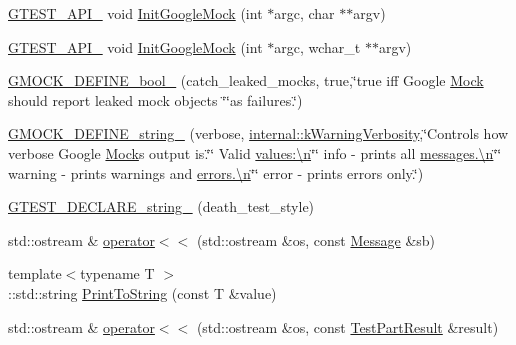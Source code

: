\begin{DoxyCompactItemize}
\hyperlink{gtest-port_8h_aa73be6f0ba4a7456180a94904ce17790}{G\+T\+E\+S\+T\+\_\+\+A\+P\+I\+\_\+} void \hyperlink{namespacetesting_a32b1c6db9ba5133ccabfa67616b3c041}{Init\+Google\+Mock} (int $\ast$argc, char $\ast$$\ast$argv)
\item 
\hyperlink{gtest-port_8h_aa73be6f0ba4a7456180a94904ce17790}{G\+T\+E\+S\+T\+\_\+\+A\+P\+I\+\_\+} void \hyperlink{namespacetesting_a20fb86152763dddef67bc1dd8b090800}{Init\+Google\+Mock} (int $\ast$argc, wchar\+\_\+t $\ast$$\ast$argv)
\item 
\hyperlink{namespacetesting_ac4efd3cec9fd78f180d825c1d178b970}{G\+M\+O\+C\+K\+\_\+\+D\+E\+F\+I\+N\+E\+\_\+bool\+\_\+} (catch\+\_\+leaked\+\_\+mocks, true,\char`\"{}true iff Google \hyperlink{classtesting_1_1Mock}{Mock} should report leaked mock objects \char`\"{}\char`\"{}as failures.\char`\"{})
\item 
\hyperlink{namespacetesting_a17cbc94a0a3ef8fdf7d58fc5dcdcce2a}{G\+M\+O\+C\+K\+\_\+\+D\+E\+F\+I\+N\+E\+\_\+string\+\_\+} (verbose, \hyperlink{namespacetesting_1_1internal_ad9386ccda6b6deac2f7b84784d3088c0}{internal\+::k\+Warning\+Verbosity},\char`\"{}Controls how verbose Google \hyperlink{classtesting_1_1Mock}{Mock}\textquotesingle{}s output is.\char`\"{}\char`\"{}  Valid \hyperlink{app_2main_8cpp_acfc02ec89670db29251fda6a66602ce2}{values\+:\textbackslash{}n}\char`\"{}\char`\"{}  info    -\/ prints all \hyperlink{app_2main_8cpp_acfc02ec89670db29251fda6a66602ce2}{messages.\textbackslash{}n}\char`\"{}\char`\"{}  warning -\/ prints warnings and \hyperlink{app_2main_8cpp_acfc02ec89670db29251fda6a66602ce2}{errors.\textbackslash{}n}\char`\"{}\char`\"{}  error   -\/ prints errors only.\char`\"{})
\item 
\hyperlink{namespacetesting_a37b7e87f0a5f502c6918f37d1768c1f3}{G\+T\+E\+S\+T\+\_\+\+D\+E\+C\+L\+A\+R\+E\+\_\+string\+\_\+} (death\+\_\+test\+\_\+style)
\item 
std\+::ostream \& \hyperlink{namespacetesting_a7b802e532fd68749765cb7dc156130db}{operator$<$$<$} (std\+::ostream \&os, const \hyperlink{classtesting_1_1Message}{Message} \&sb)
\item 
{\footnotesize template$<$typename T $>$ }\\\+::std\+::string \hyperlink{namespacetesting_aa5717bb1144edd1d262d310ba70c82ed}{Print\+To\+String} (const T \&value)
\item 
std\+::ostream \& \hyperlink{namespacetesting_a7c88897836b9f492190fb2b9dfa3a327}{operator$<$$<$} (std\+::ostream \&os, const \hyperlink{classtesting_1_1TestPartResult}{Test\+Part\+Result} \&result)

\end{DoxyCompactItemize}
